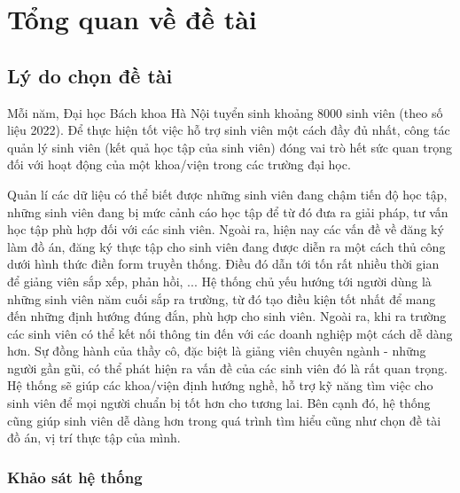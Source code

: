 \chapter{Tổng quan về đề tài}
\section{Lý do chọn đề tài}
Mỗi năm, Đại học Bách khoa Hà Nội tuyển sinh khoảng 8000 sinh viên (theo số liệu 2022). 
Để thực hiện tốt việc hỗ trợ sinh viên một cách đầy đủ nhất, công tác quản lý sinh viên (kết quả học tập của sinh viên) đóng vai trò hết sức quan trọng đối với hoạt động của một khoa/viện trong các trường đại học.

Quản lí các dữ liệu có thể biết được những sinh viên đang chậm tiến độ học tập, những sinh viên đang bị mức cảnh cáo học tập để từ đó đưa ra giải pháp, tư vấn học tập phù hợp đối với các sinh viên.
Ngoài ra, hiện nay các vấn đề về đăng ký làm đồ án, đăng ký thực tập cho sinh viên đang được diễn ra một cách thủ công dưới hình thức điền form truyền thống.
Điều đó dẫn tới tốn rất nhiều thời gian để giảng viên sắp xếp, phản hồi, ... 
Hệ thống chủ yếu hướng tới người dùng là những sinh viên năm cuối sắp ra trường, từ đó tạo điều kiện tốt nhất để mang đến những định hướng đúng đắn, phù hợp cho sinh viên.
Ngoài ra, khi ra trường các sinh viên có thể kết nối thông tin đến với các doanh nghiệp một cách dễ dàng hơn.
Sự đồng hành của thầy cô, đặc biệt là giảng viên chuyên ngành - những người gần gũi, có thể phát hiện ra vấn đề của các sinh viên đó là rất quan trọng.
Hệ thống sẽ giúp các khoa/viện định hướng nghề, hỗ trợ kỹ năng tìm việc cho sinh viên để mọi người chuẩn bị tốt hơn cho tương lai.
Bên cạnh đó, hệ thống cũng giúp sinh viên dễ dàng hơn trong quá trình tìm hiểu cũng như chọn đề tài đồ án, vị trí thực tập của mình.

\subsection*{Khảo sát hệ thống}

